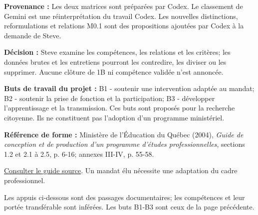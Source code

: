 \documentclass[9pt,a4paper,landscape]{extarticle}
\begin{document}
\textbf{Provenance :} Les deux matrices sont préparées par Codex. Le classement de Gemini est une réinterprétation du travail Codex. Les nouvelles distinctions, reformulations et relations M0.1 sont des propositions ajoutées par Codex à la demande de Steve.\par
\textbf{Décision :} Steve examine les compétences, les relations et les critères; les données brutes et les entretiens pourront les contredire, les diviser ou les supprimer. Aucune clôture de 1B ni compétence validée n’est annoncée.\par
\textbf{Buts de travail du projet :} B1 - soutenir une intervention adaptée au mandat; B2 - soutenir la prise de fonction et la participation; B3 - développer l’apprentissage et la transmission. Ces buts sont proposés pour la recherche citoyenne. Ils ne constituent pas l’adoption d’un programme ministériel.\par
\textbf{Référence de forme :} Ministère de l’Éducation du Québec (2004), \emph{Guide de conception et de production d’un programme d’études professionnelles}, sections 1.2 et 2.1 à 2.5, p. 6-16; annexes III-IV, p. 55-58.\par\href{https://www.inforoutefpt.org/ministere_docs/adminInfo/guideProgramme/GuideConceptionProduction_FP.pdf}{Consulter le guide source}. Un mandat élu nécessite une adaptation du cadre professionnel.\par
{}\par
\small Les appuis ci-dessous sont des passages documentaires; les compétences et leur portée transférable sont inférées. Les buts B1-B3 sont ceux de la page précédente.\par
\end{document}
